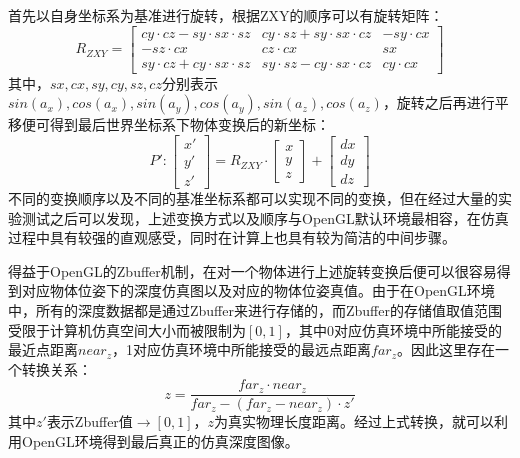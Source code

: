 首先以自身坐标系为基准进行旋转，根据ZXY的顺序可以有旋转矩阵：
\begin{equation}
	R_{ZXY}=
	\begin{bmatrix} 
	cy\cdot cz-sy\cdot sx\cdot sz & cy\cdot sz+sy\cdot sx\cdot cz & -sy\cdot cx \\
	-sz\cdot cx & cz\cdot cx & sx \\
	sy\cdot cz+cy\cdot sx\cdot sz & sy\cdot sz-cy\cdot sx\cdot cz & cy\cdot cx 
	\end{bmatrix} 
\end{equation}
其中，$sx,cx,sy,cy,sz,cz$分别表示$sin(a_x),cos(a_x),sin(a_y),cos(a_y),sin(a_z),cos(a_z)$，旋转之后再进行平移便可得到最后世界坐标系下物体变换后的新坐标：
\begin{equation}
	P':\left[\begin{aligned}x' \\y' \\ z'\end{aligned}\right]=
	R_{ZXY}\cdot \left[\begin{aligned}x \\y \\ z\end{aligned}\right]+
	\left[\begin{aligned}dx \\dy \\ dz\end{aligned}\right]
\end{equation}
不同的变换顺序以及不同的基准坐标系都可以实现不同的变换，但在经过大量的实验测试之后可以发现，上述变换方式以及顺序与OpenGL默认环境最相容，在仿真过程中具有较强的直观感受，同时在计算上也具有较为简洁的中间步骤。

得益于OpenGL的Zbuffer机制，在对一个物体进行上述旋转变换后便可以很容易得到对应物体位姿下的深度仿真图以及对应的物体位姿真值。由于在OpenGL环境中，所有的深度数据都是通过Zbuffer来进行存储的，而Zbuffer的存储值取值范围受限于计算机仿真空间大小而被限制为$[0,1]$，其中0对应仿真环境中所能接受的最近点距离$near_z$，1对应仿真环境中所能接受的最远点距离$far_z$。因此这里存在一个转换关系：
\begin{equation}
	z=\frac{far_z\cdot near_z}{far_z - (far_z-near_z)\cdot z'}
\end{equation}
其中$z'$表示Zbuffer值$\to [0,1]$，$z$为真实物理长度距离。经过上式转换，就可以利用OpenGL环境得到最后真正的仿真深度图像。

